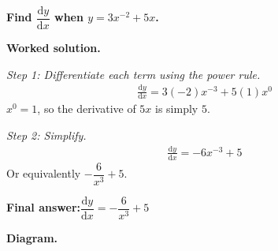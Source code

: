 \documentclass[11pt]{article}
\newcommand{\question}[1]{\par\medskip\noindent\textbf{#1}\par}
\begin{document}
\question{Find \( \dfrac{\mathrm{d}y}{\mathrm{d}x} \) when \( y = 3x^{-2} + 5x \).}

\textbf{Worked solution.}

\textit{Step 1: Differentiate each term using the power rule.}
\[\begin{gathered}
\frac{\mathrm{d}y}{\mathrm{d}x} = 3(-2)x^{-3} + 5(1)x^0
\end{gathered}\]
\(x^0 = 1\), so the derivative of \(5x\) is simply \(5\).

\textit{Step 2: Simplify.}
\[\begin{gathered}
\frac{\mathrm{d}y}{\mathrm{d}x} = -6x^{-3} + 5
\end{gathered}\]
Or equivalently \( -\dfrac{6}{x^3} + 5 \).

\begin{answerbox}
\textbf{Final answer:}\quad \(\displaystyle  \dfrac{\mathrm{d}y}{\mathrm{d}x} = -\dfrac{6}{x^3} + 5 \)
\end{answerbox}
\textbf{Diagram.}
\end{document}
